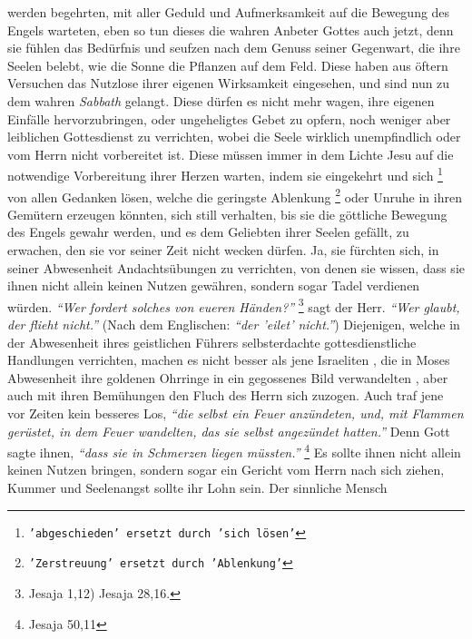 werden begehrten, mit aller Geduld und Aufmerksamkeit auf
die Bewegung des
Engels warteten, eben so tun dieses die wahren Anbeter Gottes auch jetzt, denn
sie fühlen das Bedürfnis und seufzen nach dem Genuss seiner Gegenwart, die
ihre Seelen belebt, wie die Sonne die Pflanzen auf dem Feld. Diese haben aus
öftern Versuchen das Nutzlose ihrer eigenen Wirksamkeit eingesehen, und sind nun
zu dem wahren \textit{Sabbath}  gelangt. Diese dürfen es nicht
mehr wagen, ihre
eigenen Einfälle hervorzubringen, oder ungeheligtes Gebet zu opfern, noch
weniger aber leiblichen Gottesdienst zu verrichten, wobei die Seele wirklich
unempfindlich oder vom Herrn nicht vorbereitet ist. Diese müssen immer in dem
Lichte Jesu  auf die notwendige Vorbereitung ihrer Herzen
warten, indem sie
eingekehrt und sich  \footnote{\texttt{'abgeschieden' ersetzt durch 'sich
lösen'}} von allen Gedanken lösen, welche die geringste Ablenkung
\footnote{\texttt{'Zerstreuung' ersetzt durch 'Ablenkung'}}
oder Unruhe in ihren Gemütern erzeugen könnten, sich still verhalten, bis sie
die göttliche Bewegung des Engels gewahr werden, und es dem Geliebten ihrer
Seelen gefällt, zu erwachen, den sie vor seiner Zeit nicht wecken dürfen. Ja,
sie fürchten sich, in seiner Abwesenheit Andachtsübungen zu verrichten, von
denen sie wissen, dass sie ihnen nicht allein keinen Nutzen gewähren, sondern
sogar Tadel verdienen würden.
\textit{"`Wer fordert solches von eueren Händen?"'}
\footnote{Jesaja 1,12) Jesaja 28,16.}
sagt der Herr.
\textit{"`Wer glaubt, der flieht nicht."'} (Nach dem Englischen: \textit{"`der
'eilet' nicht."'}) Diejenigen,
welche in der Abwesenheit ihres geistlichen Führers selbsterdachte
gottesdienstliche Handlungen verrichten, machen es nicht besser als jene
Israeliten , die in Moses
Abwesenheit ihre goldenen Ohrringe in ein
gegossenes Bild verwandelten , aber auch mit ihren
Bemühungen den Fluch  des Herrn sich zuzogen. Auch traf jene vor
Zeiten kein besseres Los,
\textit{"`die selbst ein Feuer anzündeten, und, mit Flammen gerüstet, in dem
Feuer wandelten, das sie
selbst angezündet hatten."'} Denn Gott sagte ihnen,
\textit{"`dass sie in Schmerzen liegen müssten."'}
\footnote{Jesaja 50,11}
Es sollte ihnen nicht allein keinen
Nutzen bringen, sondern sogar ein Gericht vom Herrn nach sich ziehen, Kummer und
Seelenangst sollte ihr Lohn sein. Der sinnliche Mensch
